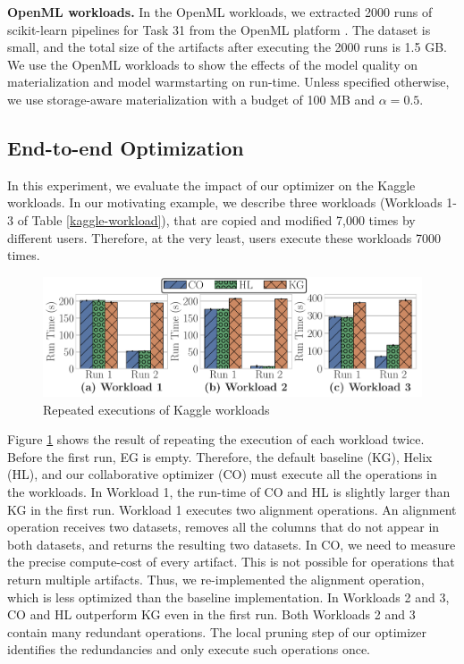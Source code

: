 \textbf{OpenML workloads.} 
In the OpenML workloads, we extracted 2000 runs of scikit-learn pipelines for Task 31 from the OpenML platform \cite{openml-31}.
The dataset is small, and the total size of the artifacts after executing the 2000 runs is 1.5 GB.
We use the OpenML workloads to show the effects of the model quality on materialization and model warmstarting on run-time.
Unless specified otherwise, we use storage-aware materialization with a budget of 100 MB and $\alpha=0.5$.

\subsection{End-to-end Optimization}
In this experiment, we evaluate the impact of our optimizer on the Kaggle workloads.
In our motivating example, we describe three workloads (Workloads 1-3 of Table \ref{kaggle-workload}), that are copied and modified 7,000 times by different users.
Therefore, at the very least, users execute these workloads 7000 times.
\begin{figure}[ht]
\centering
\includegraphics[width=1.0\columnwidth]{images/experiment-results/kaggle_home_credit/execution_time/repeated_workloads}
\caption{Repeated executions of Kaggle workloads}
\label{exp-execution-repeated-kaggle-workload}
\vspace{-4mm}
\end{figure}

Figure \ref{exp-execution-repeated-kaggle-workload} shows the result of repeating the execution of each workload twice.
Before the first run, EG is empty. 
Therefore, the default baseline (KG), Helix (HL), and our collaborative optimizer (CO) must execute all the operations in the workloads.
In Workload 1, the run-time of CO and HL is slightly larger than KG in the first run.
Workload 1 executes two alignment operations.
An alignment operation receives two datasets, removes all the columns that do not appear in both datasets, and returns the resulting two datasets.
In CO, we need to measure the precise compute-cost of every artifact.
This is not possible for operations that return multiple artifacts.
Thus, we re-implemented the alignment operation, which is less optimized than the baseline implementation.
In Workloads 2 and 3, CO and HL outperform KG even in the first run.
Both Workloads 2 and 3 contain many redundant operations.
The local pruning step of our optimizer identifies the redundancies and only execute such operations once.

